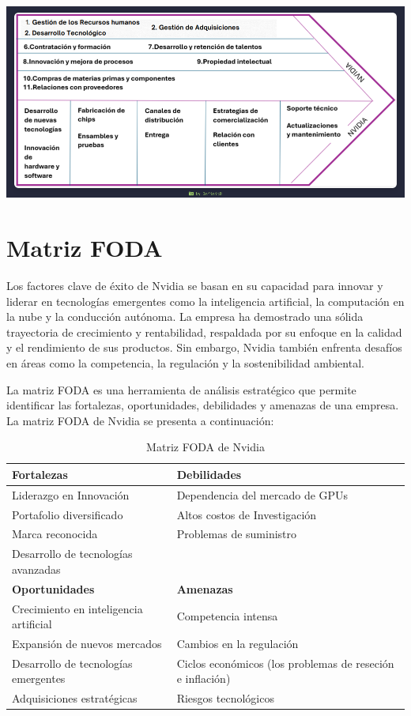 \documentclass{article}
\begin{document}
\begin{center}
  \includegraphics[width=15cm]{./assets/cadenadevalor.png}
\end{center}

\section{Matriz FODA}

Los factores clave de éxito de Nvidia se basan en su capacidad para innovar y liderar en tecnologías emergentes como la inteligencia artificial, la computación en la nube y la conducción autónoma. La empresa ha demostrado una sólida trayectoria de crecimiento y rentabilidad, respaldada por su enfoque en la calidad y el rendimiento de sus productos. Sin embargo, Nvidia también enfrenta desafíos en áreas como la competencia, la regulación y la sostenibilidad ambiental.

La matriz FODA es una herramienta de análisis estratégico que permite identificar las fortalezas, oportunidades, debilidades y amenazas de una empresa. La matriz FODA de Nvidia se presenta a continuación:

\begin{table}[ht!]
  \centering
  \renewcommand{\arraystretch}{1.5}
  \setlength{\tabcolsep}{5pt}
  \begin{tabular}{|p{6cm}|p{6cm}|}
    \hline
    \textbf{Fortalezas} & \textbf{Debilidades} \\ \hline
    Liderazgo en Innovación & Dependencia del mercado de GPUs \\ 
    Portafolio diversificado & Altos costos de Investigación \\ 
    Marca reconocida & Problemas de suministro \\ 
    Desarrollo de tecnologías avanzadas & \\ \hline
    \textbf{Oportunidades} & \textbf{Amenazas} \\ \hline
    Crecimiento en inteligencia artificial & Competencia intensa \\ 
    Expansión de nuevos mercados & Cambios en la regulación \\ 
    Desarrollo de tecnologías emergentes & Ciclos económicos (los problemas de reseción e inflación) \\ 
    Adquisiciones estratégicas & Riesgos tecnológicos \\ \hline
  \end{tabular}
  \caption{Matriz FODA de Nvidia}
  \label{tab:FODA}
\end{table}
\end{document}
